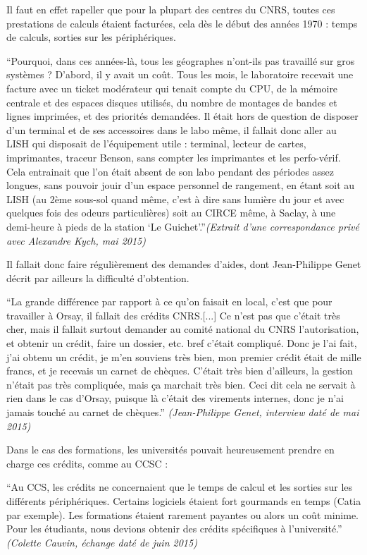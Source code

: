Il faut en effet rapeller que pour la plupart des centres du CNRS, toutes ces prestations de calculs étaient facturées, cela dès le début des années 1970 : temps de calculs, sorties sur les périphériques.

\enquote{Pourquoi, dans ces années-là, tous les géographes n'ont-ils pas travaillé sur gros systèmes ? D'abord, il y avait un coût. Tous les mois, le laboratoire recevait une facture avec un ticket modérateur qui tenait compte du CPU, de la mémoire centrale et des espaces disques utilisés, du nombre de montages de bandes et lignes imprimées, et des priorités demandées. Il était hors de question de disposer d'un terminal et de ses accessoires dans le labo même, il fallait donc aller au LISH qui disposait de l'équipement utile : terminal, lecteur de cartes, imprimantes, traceur Benson, sans compter les imprimantes et les perfo-vérif. Cela entrainait que l'on était absent de son labo pendant des périodes assez longues, sans pouvoir jouir d'un espace personnel de rangement, en étant soit au LISH (au 2ème sous-sol quand même, c'est à dire sans lumière du jour et avec quelques fois des odeurs particulières) soit au CIRCE même, à Saclay, à une demi-heure à pieds de la station \enquote{Le Guichet}.}\textit{(Extrait d'une correspondance privé avec Alexandre Kych, mai 2015)}

Il fallait donc faire régulièrement des demandes d'aides, dont Jean-Philippe Genet décrit par ailleurs la difficulté d'obtention.

\enquote{La grande différence par rapport à ce qu'on faisait en local, c'est que pour travailler à Orsay, il fallait des crédits CNRS.[...] Ce n’est pas que c'était très cher, mais il fallait surtout demander au comité national du CNRS l'autorisation, et obtenir un crédit, faire un dossier, etc. bref c'était compliqué. Donc je l'ai fait, j'ai obtenu un crédit, je m'en souviens très bien, mon premier crédit était de mille francs, et je recevais un carnet de chèques. C'était très bien d'ailleurs, la gestion n'était pas très compliquée, mais ça marchait très bien. Ceci dit cela ne servait à rien dans le cas d'Orsay, puisque là c'était des virements internes, donc je n’ai jamais touché au carnet de chèques.} \textit{(Jean-Philippe Genet, interview daté de mai 2015)}

Dans le cas des formations, les universités pouvait heureusement prendre en charge ces crédits, comme au CCSC :

\enquote{Au CCS, les crédits ne concernaient que le temps de calcul et les sorties sur les différents périphériques. Certains logiciels étaient fort gourmands en temps (Catia par exemple). Les formations étaient rarement payantes ou alors un coût minime. Pour les étudiants, nous devions obtenir des crédits spécifiques à l’université.} \textit{(Colette Cauvin, échange daté de juin  2015)}

